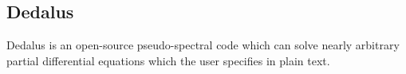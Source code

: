 {\color{purple}    
\subsection{Dedalus}}

Dedalus is an open-source pseudo-spectral code which can solve nearly arbitrary partial differential equations which the user specifies in plain text. 
